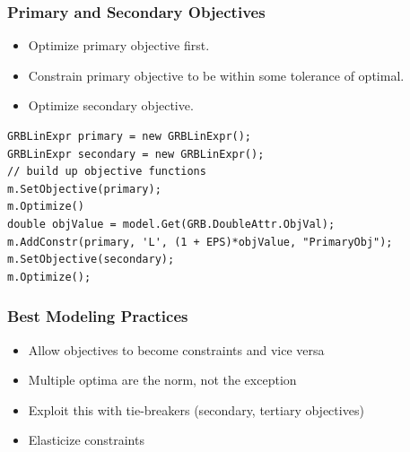 \documentclass[12pt,handout]{beamer}
\begin{document}
\begin{frame} [containsverbatim]
\frametitle{Primary and Secondary Objectives}
\begin{itemize}
\item Optimize primary objective first.
\item Constrain primary objective to be within some tolerance of optimal.
\item Optimize secondary objective.
\end{itemize}
\small
\begin{verbatim}
GRBLinExpr primary = new GRBLinExpr();
GRBLinExpr secondary = new GRBLinExpr();
// build up objective functions
m.SetObjective(primary);
m.Optimize()
double objValue = model.Get(GRB.DoubleAttr.ObjVal);
m.AddConstr(primary, 'L', (1 + EPS)*objValue, "PrimaryObj");
m.SetObjective(secondary);
m.Optimize();
\end{verbatim}
\end{frame}

\begin{frame}
\frametitle{Best Modeling Practices}
\begin{itemize}
\item Allow objectives to become constraints and vice versa
\item Multiple optima are the norm, not the exception
\item Exploit this with tie-breakers (secondary, tertiary objectives)
\item Elasticize constraints
\end{itemize}
\end{frame}

\end{document}
